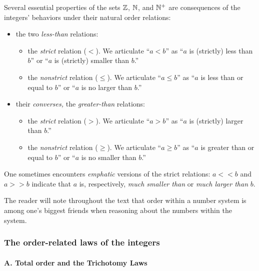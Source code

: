 Several essential properties of the sets $\mathbb{Z}$, $\mathbb{N}$, and $\mathbb{N}^+$ are
consequences of the integers' behaviors under their natural order
relations:
\begin{itemize}
\item
the two {\em less-than} relations:
  \begin{itemize}
  \item
the {\em strict} relation ($<$).  We articulate ``$a < b$'' as ``$a$
is (strictly) less than $b$'' or ``$a$ is (strictly) smaller than
$b$.''
  \item
the {\em nonstrict} relation ($\leq$).  We articulate ``$a \leq b$''
as ``$a$ is less than or equal to $b$'' or ``$a$ is no larger than
$b$.''
  \end{itemize}
 

\item
their {\em converses,} the {\em greater-than} relations:
  \begin{itemize}
  \item
the {\em strict} relation ($>$).  We articulate ``$a > b$'' as ``$a$
is (strictly) larger than $b$.''
  \item
the {\em nonstrict} relation ($\geq$).  We articulate ``$a \geq b$''
as ``$a$ is greater than or equal to $b$'' or ``$a$ is no smaller than
$b$.''
  \end{itemize}
\end{itemize}
One sometimes encounters {\em emphatic} versions of the strict
relations: $a << b$ and $a >> b$ indicate that $a$ is, respectively,
{\em much smaller than} or {\em much larger than} $b$.

The reader will note throughout the text that order within a number
system is among one's biggest friends when reasoning about the numbers
within the system.  

\subsubsection{The order-related laws of the integers}
\label{sec:order-laws}

\paragraph{\small\sf A. Total order and the Trichotomy Laws}

